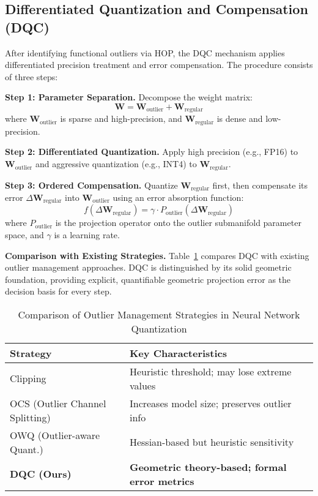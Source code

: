 \documentclass[letterpaper,twocolumn,10pt]{article}
\begin{document}
\subsection{Differentiated Quantization and Compensation (DQC)}

After identifying functional outliers via HOP, the DQC mechanism applies differentiated precision treatment and error compensation. The procedure consists of three steps:

\textbf{Step 1: Parameter Separation.} Decompose the weight matrix:
\begin{equation}
\mathbf{W} = \mathbf{W}_{\text{outlier}} + \mathbf{W}_{\text{regular}}
\end{equation}
where $\mathbf{W}_{\text{outlier}}$ is sparse and high-precision, and $\mathbf{W}_{\text{regular}}$ is dense and low-precision.

\textbf{Step 2: Differentiated Quantization.} Apply high precision (e.g., FP16) to $\mathbf{W}_{\text{outlier}}$ and aggressive quantization (e.g., INT4) to $\mathbf{W}_{\text{regular}}$.

\textbf{Step 3: Ordered Compensation.} Quantize $\mathbf{W}_{\text{regular}}$ first, then compensate its error $\Delta \mathbf{W}_{\text{regular}}$ into $\mathbf{W}_{\text{outlier}}$ using an error absorption function:
\begin{equation}
f(\Delta \mathbf{W}_{\text{regular}}) = \gamma \cdot P_{\text{outlier}}(\Delta \mathbf{W}_{\text{regular}})
\label{eq:compensation}
\end{equation}
where $P_{\text{outlier}}$ is the projection operator onto the outlier submanifold parameter space, and $\gamma$ is a learning rate.

\textbf{Comparison with Existing Strategies.} Table~\ref{tab:outlier_strategies} compares DQC with existing outlier management approaches. DQC is distinguished by its solid geometric foundation, providing explicit, quantifiable geometric projection error as the decision basis for every step.

\begin{table}[t]
\centering
\caption{Comparison of Outlier Management Strategies in Neural Network Quantization}
\label{tab:outlier_strategies}
\small
\begin{tabular}{@{}lp{5.5cm}@{}}
\toprule
\textbf{Strategy} & \textbf{Key Characteristics} \\
\midrule
Clipping & Heuristic threshold; may lose extreme values \\
OCS (Outlier Channel Splitting) & Increases model size; preserves outlier info \\
OWQ (Outlier-aware Quant.) & Hessian-based but heuristic sensitivity \\
\textbf{DQC (Ours)} & \textbf{Geometric theory-based; formal error metrics} \\
\bottomrule
\end{tabular}
\end{table}
\end{document}
